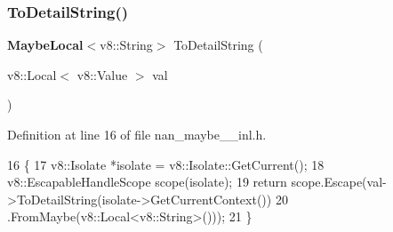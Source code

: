 \subsubsection{To\+Detail\+String()}
{\footnotesize\ttfamily \textbf{ Maybe\+Local}$<$v8\+::\+String$>$ To\+Detail\+String (\begin{DoxyParamCaption}\item[{v8\+::\+Local$<$ v8\+::\+Value $>$}]{val }\end{DoxyParamCaption})}



Definition at line 16 of file nan\+\_\+maybe\+\_\+\_\+inl.\+h.


\begin{DoxyCode}
16                                                           \{
17   v8::Isolate *isolate = v8::Isolate::GetCurrent();
18   v8::EscapableHandleScope scope(isolate);
19   \textcolor{keywordflow}{return} scope.Escape(val->ToDetailString(isolate->GetCurrentContext())
20                           .FromMaybe(v8::Local<v8::String>()));
21 \}
\end{DoxyCode}
